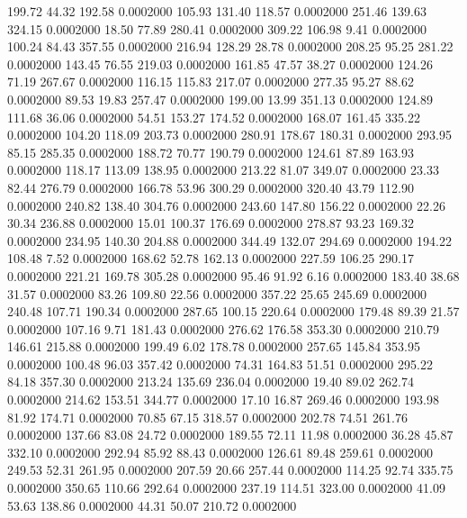  199.72   44.32  192.58   0.0002000
 105.93  131.40  118.57   0.0002000
 251.46  139.63  324.15   0.0002000
  18.50   77.89  280.41   0.0002000
 309.22  106.98    9.41   0.0002000
 100.24   84.43  357.55   0.0002000
 216.94  128.29   28.78   0.0002000
 208.25   95.25  281.22   0.0002000
 143.45   76.55  219.03   0.0002000
 161.85   47.57   38.27   0.0002000
 124.26   71.19  267.67   0.0002000
 116.15  115.83  217.07   0.0002000
 277.35   95.27   88.62   0.0002000
  89.53   19.83  257.47   0.0002000
 199.00   13.99  351.13   0.0002000
 124.89  111.68   36.06   0.0002000
  54.51  153.27  174.52   0.0002000
 168.07  161.45  335.22   0.0002000
 104.20  118.09  203.73   0.0002000
 280.91  178.67  180.31   0.0002000
 293.95   85.15  285.35   0.0002000
 188.72   70.77  190.79   0.0002000
 124.61   87.89  163.93   0.0002000
 118.17  113.09  138.95   0.0002000
 213.22   81.07  349.07   0.0002000
  23.33   82.44  276.79   0.0002000
 166.78   53.96  300.29   0.0002000
 320.40   43.79  112.90   0.0002000
 240.82  138.40  304.76   0.0002000
 243.60  147.80  156.22   0.0002000
  22.26   30.34  236.88   0.0002000
  15.01  100.37  176.69   0.0002000
 278.87   93.23  169.32   0.0002000
 234.95  140.30  204.88   0.0002000
 344.49  132.07  294.69   0.0002000
 194.22  108.48    7.52   0.0002000
 168.62   52.78  162.13   0.0002000
 227.59  106.25  290.17   0.0002000
 221.21  169.78  305.28   0.0002000
  95.46   91.92    6.16   0.0002000
 183.40   38.68   31.57   0.0002000
  83.26  109.80   22.56   0.0002000
 357.22   25.65  245.69   0.0002000
 240.48  107.71  190.34   0.0002000
 287.65  100.15  220.64   0.0002000
 179.48   89.39   21.57   0.0002000
 107.16    9.71  181.43   0.0002000
 276.62  176.58  353.30   0.0002000
 210.79  146.61  215.88   0.0002000
 199.49    6.02  178.78   0.0002000
 257.65  145.84  353.95   0.0002000
 100.48   96.03  357.42   0.0002000
  74.31  164.83   51.51   0.0002000
 295.22   84.18  357.30   0.0002000
 213.24  135.69  236.04   0.0002000
  19.40   89.02  262.74   0.0002000
 214.62  153.51  344.77   0.0002000
  17.10   16.87  269.46   0.0002000
 193.98   81.92  174.71   0.0002000
  70.85   67.15  318.57   0.0002000
 202.78   74.51  261.76   0.0002000
 137.66   83.08   24.72   0.0002000
 189.55   72.11   11.98   0.0002000
  36.28   45.87  332.10   0.0002000
 292.94   85.92   88.43   0.0002000
 126.61   89.48  259.61   0.0002000
 249.53   52.31  261.95   0.0002000
 207.59   20.66  257.44   0.0002000
 114.25   92.74  335.75   0.0002000
 350.65  110.66  292.64   0.0002000
 237.19  114.51  323.00   0.0002000
  41.09   53.63  138.86   0.0002000
  44.31   50.07  210.72   0.0002000
